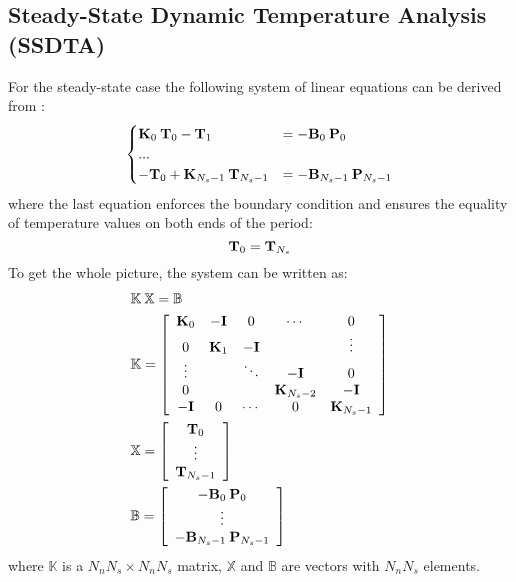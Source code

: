 \subsection{Steady-State Dynamic Temperature Analysis (SSDTA)}
For the steady-state case the following system of linear equations can be derived from :
\[
  \begin{cases}
    \mathbf{K}_0 \: \mathbf{T}_0 - \mathbf{T}_1 & = -\mathbf{B}_0 \: \mathbf{P}_0 \\
    ... \\
    -\mathbf{T}_0 + \mathbf{K}_{N_s - 1} \: \mathbf{T}_{N_s - 1} & = -\mathbf{B}_{N_s - 1} \: \mathbf{P}_{N_s - 1}
  \end{cases}
\]
where the last equation enforces the boundary condition and ensures the equality of temperature values on both ends of the period:
\begin{equation} \label{eq:boundary-condition}
  \mathbf{T}_0 = \mathbf{T}_{N_s}
\end{equation}
To get the whole picture, the system can be written as:
\begin{align}
  & \mathbb{K} \: \mathbb{X} = \mathbb{B} \label{eq:system} \\
  & \mathbb{K} = \left[
    \begin{array}{ccccc}
      \mathbf{K}_0 & -\mathbf{I} & 0 & \cdots & 0 \\
      0 & \mathbf{K}_1 & -\mathbf{I} &  & \vdots \\
      \vdots &  & \ddots & -\mathbf{I} & 0 \\
      0 &  &  & \mathbf{K}_{N_s - 2} & -\mathbf{I} \\
      -\mathbf{I} & 0 & \cdots & 0 & \mathbf{K}_{N_s - 1}
    \end{array}
  \right] \nonumber \\
  & \mathbb{X} = \left[
    \begin{array}{c}
      \mathbf{T}_0 \\
      \vdots \\
      \mathbf{T}_{N_s - 1}
    \end{array}
  \right] \nonumber \\
  & \mathbb{B} = \left[
    \begin{array}{c}
      -\mathbf{B}_0 \: \mathbf{P}_0 \\
      \vdots \\
      -\mathbf{B}_{N_s - 1} \: \mathbf{P}_{N_s - 1}
    \end{array}
  \right] \nonumber
\end{align}
where $\mathbb{K}$ is a $N_n N_s \times N_n N_s$ matrix, $\mathbb{X}$ and $\mathbb{B}$ are vectors with $N_n N_s$ elements.

